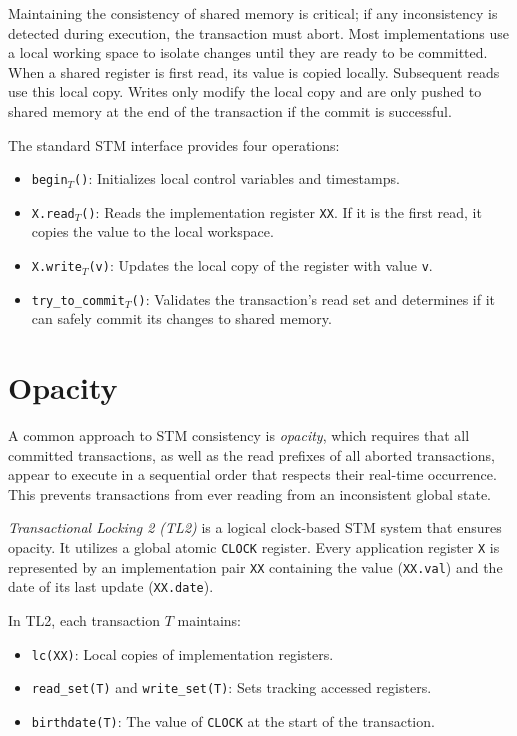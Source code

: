 Maintaining the consistency of shared memory is critical; if any inconsistency is detected during execution, the transaction must abort. Most implementations use a local working space to isolate changes until they are ready to be committed. When a shared register is first read, its value is copied locally. Subsequent reads use this local copy. Writes only modify the local copy and are only pushed to shared memory at the end of the transaction if the commit is successful.

The standard STM interface provides four operations:
\begin{itemize}
    \item \texttt{begin}$_T$\texttt{()}: Initializes local control variables and timestamps.
    \item \texttt{X.read}$_T$\texttt{()}: Reads the implementation register \texttt{XX}. If it is the first read, it copies the value to the local workspace.
    \item \texttt{X.write}$_T$\texttt{(v)}: Updates the local copy of the register with value \texttt{v}.
    \item \texttt{try\_to\_commit}$_T$\texttt{()}: Validates the transaction's read set and determines if it can safely commit its changes to shared memory.
\end{itemize}

\section{Opacity}
A common approach to STM consistency is \textit{opacity}, which requires that all committed transactions, as well as the read prefixes of all aborted transactions, appear to execute in a sequential order that respects their real-time occurrence. This prevents transactions from ever reading from an inconsistent global state.

\textit{Transactional Locking 2 (TL2)} is a logical clock-based STM system that ensures opacity. It utilizes a global atomic \texttt{CLOCK} register. Every application register \texttt{X} is represented by an implementation pair \texttt{XX} containing the value (\texttt{XX.val}) and the date of its last update (\texttt{XX.date}).

In TL2, each transaction $T$ maintains:
\begin{itemize}
    \item \texttt{lc(XX)}: Local copies of implementation registers.
    \item \texttt{read\_set(T)} and \texttt{write\_set(T)}: Sets tracking accessed registers.
    \item \texttt{birthdate(T)}: The value of \texttt{CLOCK} at the start of the transaction.
\end{itemize}
    
